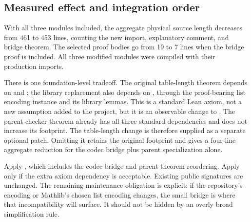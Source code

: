\subsection{Measured effect and integration order}

With all three modules included, the aggregate physical source length decreases
from 461 to 453 lines, counting the new import, explanatory comment, and
bridge theorem. The selected proof bodies go from 19 to 7 lines when the
bridge proof is included. All three modified modules were compiled with
their production imports.

There is one foundation-level tradeoff. The original table-length theorem
depends on  and ; the library replacement also
depends on , through the proof-bearing list encoding
instance and its library lemmas. This is a standard Lean axiom, not a new
assumption added to the project, but it is an observable change to
. The parent-checker theorem already has all three
standard dependencies and does not increase its footprint. The table-length
change is therefore supplied as a separate optional patch. Omitting it
retains the original footprint and gives a four-line aggregate reduction
for the codec bridge plus parent specialization alone.

Apply , which includes the codec bridge
and parent theorem reordering. Apply 
only if the extra axiom dependency is acceptable. Existing public signatures
are unchanged.
The remaining maintenance obligation is explicit: if the repository's
encoding or Mathlib's chosen list encoding changes, the small bridge is
where that incompatibility will surface. It should not be hidden by an
overly broad simplification rule.
